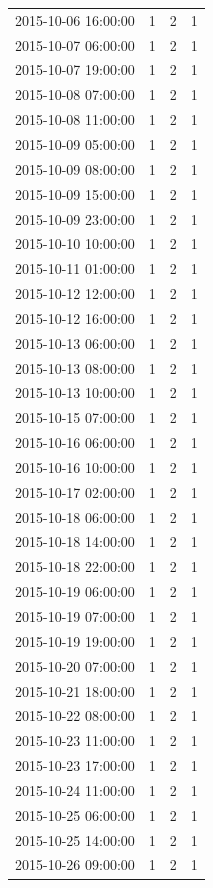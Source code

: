 \begin{tabular}{lrrr}
2015-10-06 16:00:00 & 1 & 2 & 1 \\
2015-10-07 06:00:00 & 1 & 2 & 1 \\
2015-10-07 19:00:00 & 1 & 2 & 1 \\
2015-10-08 07:00:00 & 1 & 2 & 1 \\
2015-10-08 11:00:00 & 1 & 2 & 1 \\
2015-10-09 05:00:00 & 1 & 2 & 1 \\
2015-10-09 08:00:00 & 1 & 2 & 1 \\
2015-10-09 15:00:00 & 1 & 2 & 1 \\
2015-10-09 23:00:00 & 1 & 2 & 1 \\
2015-10-10 10:00:00 & 1 & 2 & 1 \\
2015-10-11 01:00:00 & 1 & 2 & 1 \\
2015-10-12 12:00:00 & 1 & 2 & 1 \\
2015-10-12 16:00:00 & 1 & 2 & 1 \\
2015-10-13 06:00:00 & 1 & 2 & 1 \\
2015-10-13 08:00:00 & 1 & 2 & 1 \\
2015-10-13 10:00:00 & 1 & 2 & 1 \\
2015-10-15 07:00:00 & 1 & 2 & 1 \\
2015-10-16 06:00:00 & 1 & 2 & 1 \\
2015-10-16 10:00:00 & 1 & 2 & 1 \\
2015-10-17 02:00:00 & 1 & 2 & 1 \\
2015-10-18 06:00:00 & 1 & 2 & 1 \\
2015-10-18 14:00:00 & 1 & 2 & 1 \\
2015-10-18 22:00:00 & 1 & 2 & 1 \\
2015-10-19 06:00:00 & 1 & 2 & 1 \\
2015-10-19 07:00:00 & 1 & 2 & 1 \\
2015-10-19 19:00:00 & 1 & 2 & 1 \\
2015-10-20 07:00:00 & 1 & 2 & 1 \\
2015-10-21 18:00:00 & 1 & 2 & 1 \\
2015-10-22 08:00:00 & 1 & 2 & 1 \\
2015-10-23 11:00:00 & 1 & 2 & 1 \\
2015-10-23 17:00:00 & 1 & 2 & 1 \\
2015-10-24 11:00:00 & 1 & 2 & 1 \\
2015-10-25 06:00:00 & 1 & 2 & 1 \\
2015-10-25 14:00:00 & 1 & 2 & 1 \\
2015-10-26 09:00:00 & 1 & 2 & 1 \\

\end{tabular}
